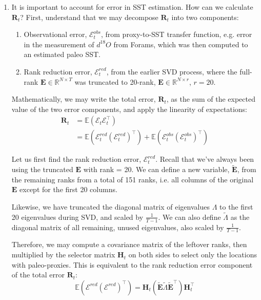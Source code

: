 \documentclass{article}
\begin{document}
\begin{enumerate}
    \item It is important to account for error in SST estimation. How can we calculate $\textbf{R}_t$? First, understand that we may decompose $\textbf{R}_t$ into two components:
    \begin{enumerate}
        \item Observational error, $\mathcal{E}^{obs}_t$, from proxy-to-SST transfer function, e.g. error in the measurement of $d^{18}O$ from Forams, which was then computed to an estimated paleo SST.
        \item Rank reduction error, $\mathcal{E}^{red}_t$, from the earlier SVD process, where the full-rank $\textbf{E} \in \mathbb{R}^{N \times T}$ was truncated to 20-rank, $\textbf{E} \in \mathbb{R}^{N \times r}$, $r=20$.
    \end{enumerate}

    Mathematically, we may write the total error, $\textbf{R}_t$, as the sum of the expected value of the two error components, and apply the linearity of expectations:
    \begin{align*}
        \textbf{R}_t &= \mathbb{E}(\mathcal{E}_t \mathcal{E}_t^\intercal) \\
        &= \mathbb{E}(\mathcal{E}_t^{red} (\mathcal{E}_t^{red})^\intercal) + \mathbb{E}(\mathcal{E}_t^{obs} (\mathcal{E}_t^{obs})^\intercal)
    \end{align*}
    
    Let us first find the rank reduction error, $\mathcal{E}^{red}_t$. 
    Recall that we've always been using the truncated $\textbf{E}$ with rank = 20. We can define a new variable, $\tilde{\textbf{E}}$, from the remaining ranks from a total of 151 ranks, i.e. all columns of the original $\textbf{E}$ except for the first 20 columns. 
    
    Likewise, we have truncated the diagonal matrix of eigenvalues $\Lambda$ to the first 20 eigenvalues during SVD, and scaled by $\frac{1}{T-1}$. We can also define $\tilde{\Lambda}$ as the diagonal matrix of all remaining, unused eigenvalues, also scaled by $\frac{1}{T-1}$.
    
    Therefore, we may compute a covariance matrix of the leftover ranks, then multiplied by the selector matrix $\textbf{H}_t$ on both sides to select only the locations with paleo-proxies.
    This is equivalent to the rank reduction error component of the total error $\textbf{R}_t$:
    $$\mathbb{E}(\mathcal{E}^{red}(\mathcal{E}^{red})^\intercal) = \textbf{H}_t (\tilde{\textbf{E}} \tilde{\Lambda}\tilde{\textbf{E}}^\intercal) \textbf{H}_t^\intercal$$


\end{enumerate}
\end{document}
